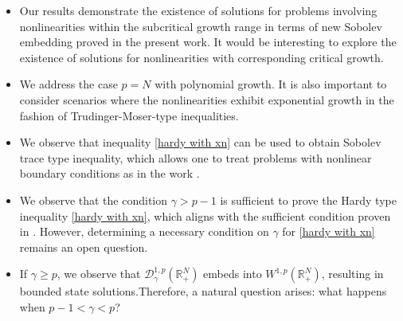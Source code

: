 \documentclass[12pt,reqno]{amsart}
\begin{document}
\begin{itemize}
\item Our results demonstrate the existence of solutions for problems involving nonlinearities within the subcritical growth range in terms of new Sobolev embedding proved in the present work. 
It would be interesting to explore the existence of solutions for nonlinearities with corresponding critical growth.
\item We address the case $p=N$ with polynomial growth. It is also important to consider scenarios
where the nonlinearities exhibit exponential growth in the fashion of Trudinger-Moser-type inequalities.
\item We observe that inequality \eqref{hardy with xn} can be used to obtain Sobolev trace type inequality, which allows one to treat problems with nonlinear boundary conditions as in the work \cite{zbMATH01215632}.
\item We observe that the condition $\gamma > p-1$ is sufficient to prove the Hardy type inequality \eqref{hardy with xn}, which aligns with the sufficient condition proven in  \cite{zbMATH05377123}. However, determining a necessary condition on $\gamma$ for \eqref{hardy with xn} remains an open question.
\item If $\gamma\geq p$, we observe that  $\mathcal{D}_\gamma^{1,p}(\mathds{R}^N_+)$ embeds into $ W^{1,p}(\mathds{R}^N_+)$, resulting in bounded state solutions.Therefore, a natural question arises: what happens when 
$p-1<\gamma<p$?
\end{itemize}






\end{document}
